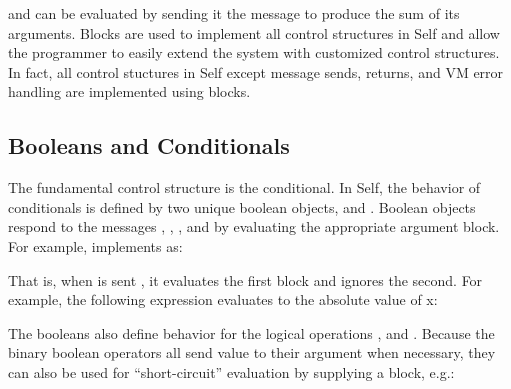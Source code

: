 \documentclass[letterpaper,10pt,english]{sphinxmanual}
\begin{document}
\begin{sphinxVerbatim}[commandchars=\\\{\}]
\PYG{p}{[}       \PYG{p}{]}
\end{sphinxVerbatim}

and can be evaluated by sending it the message  to produce the sum of its arguments.
Blocks are used to implement all control structures in Self and allow the programmer to
easily extend the system with customized control structures. In fact, all control stuctures in Self
except message sends, returns, and VM error handling are implemented using blocks.


\subsection{Booleans and Conditionals}
\label{\detokenize{blocks:booleans-and-conditionals}}
The fundamental control structure is the conditional. In Self, the behavior of conditionals is defined
by two unique boolean objects,  and . Boolean objects respond to the messages
, , , and  by evaluating the appropriate argument
block. For example,  implements  as:

\begin{sphinxVerbatim}[commandchars=\\\{\}]
        
\end{sphinxVerbatim}

That is, when  is sent , it evaluates the first block and ignores the second.
For example, the following expression evaluates to the absolute value of x:

\begin{sphinxVerbatim}[commandchars=\\\{\}]
    \PYG{p}{[}   \PYG{p}{]}  \PYG{p}{[}  \PYG{p}{]}
\end{sphinxVerbatim}

The booleans also define behavior for the logical operations , and . Because the binary boolean operators all send value to their argument when
necessary, they can also be used for “short-circuit” evaluation by supplying a block, e.g.:
\end{document}
